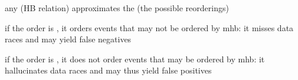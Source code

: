 \documentclass[landscape, a4paper]{article}
\begin{document}
\begin{minipage}[t]{0.19\linewidth}
	\begin{betterlist}
		\item any  (HB relation) approximates the  (the possible reorderings)
		\begin{betterlist}
			\item if the order is , it orders events that may not be ordered by mhb: it misses data races and may yield false negatives
			\item if the order is , it does not order events that may be ordered by mhb: it hallucinates data races and may thus yield false positives
		\end{betterlist}

\end{betterlist}
\end{minipage}
\end{document}
